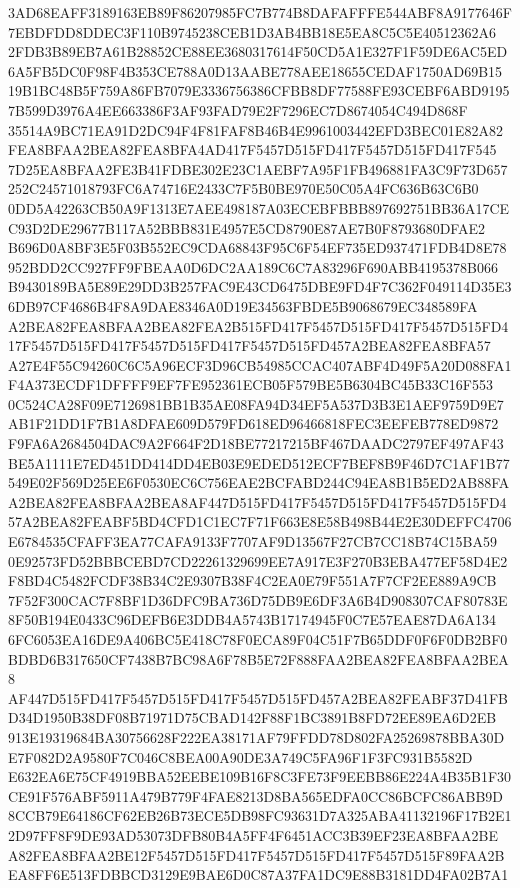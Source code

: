 \documentclass[UTF8,fontset=fandol,zihao=-4,a4paper]{ctexart}
\begin{document}
{{3AD68EAFF3189163EB89F86207985FC7B774B8DAFAFFFE544ABF8A9177646F7EBDFDD8DDEC3F110B9745238CEB1D3AB4BB18E5EA8C5C5E40512362A6
2FDB3B89EB7A61B28852CE88EE3680317614F50CD5A1E327F1F59DE6AC5ED6A5FB5DC0F98F4B353CE788A0D13AABE778AEE18655CEDAF1750AD69B15
19B1BC48B5F759A86FB7079E3336756386CFBB8DF77588FE93CEBF6ABD91957B599D3976A4EE663386F3AF93FAD79E2F7296EC7D8674054C494D868F
35514A9BC71EA91D2DC94F4F81FAF8B46B4E9961003442EFD3BEC01E82A82FEA8BFAA2BEA82FEA8BFA4AD417F5457D515FD417F5457D515FD417F545
7D25EA8BFAA2FE3B41FDBE302E23C1AEBF7A95F1FB496881FA3C9F73D657252C24571018793FC6A74716E2433C7F5B0BE970E50C05A4FC636B63C6B0
0DD5A42263CB50A9F1313E7AEE498187A03ECEBFBBB897692751BB36A17CEC93D2DE29677B117A52BBB831E4957E5CD8790E87AE7B0F8793680DFAE2
B696D0A8BF3E5F03B552EC9CDA68843F95C6F54EF735ED937471FDB4D8E78952BDD2CC927FF9FBEAA0D6DC2AA189C6C7A83296F690ABB4195378B066
B9430189BA5E89E29DD3B257FAC9E43CD6475DBE9FD4F7C362F049114D35E36DB97CF4686B4F8A9DAE8346A0D19E34563FBDE5B9068679EC348589FA
A2BEA82FEA8BFAA2BEA82FEA2B515FD417F5457D515FD417F5457D515FD417F5457D515FD417F5457D515FD417F5457D515FD457A2BEA82FEA8BFA57
A27E4F55C94260C6C5A96ECF3D96CB54985CCAC407ABF4D49F5A20D088FA1F4A373ECDF1DFFFF9EF7FE952361ECB05F579BE5B6304BC45B33C16F553
0C524CA28F09E7126981BB1B35AE08FA94D34EF5A537D3B3E1AEF9759D9E7AB1F21DD1F7B1A8DFAE609D579FD618ED96466818FEC3EEFEB778ED9872
F9FA6A2684504DAC9A2F664F2D18BE77217215BF467DAADC2797EF497AF43BE5A1111E7ED451DD414DD4EB03E9EDED512ECF7BEF8B9F46D7C1AF1B77
549E02F569D25EE6F0530EC6C756EAE2BCFABD244C94EA8B1B5ED2AB88FAA2BEA82FEA8BFAA2BEA8AF447D515FD417F5457D515FD417F5457D515FD4
57A2BEA82FEABF5BD4CFD1C1EC7F71F663E8E58B498B44E2E30DEFFC4706E6784535CFAFF3EA77CAFA9133F7707AF9D13567F27CB7CC18B74C15BA59
0E92573FD52BBBCEBD7CD22261329699EE7A917E3F270B3EBA477EF58D4E2F8BD4C5482FCDF38B34C2E9307B38F4C2EA0E79F551A7F7CF2EE889A9CB
7F52F300CAC7F8BF1D36DFC9BA736D75DB9E6DF3A6B4D908307CAF80783E8F50B194E0433C96DEFB6E3DDB4A5743B17174945F0C7E57EAE87DA6A134
6FC6053EA16DE9A406BC5E418C78F0ECA89F04C51F7B65DDF0F6F0DB2BF0BDBD6B317650CF7438B7BC98A6F78B5E72F888FAA2BEA82FEA8BFAA2BEA8
AF447D515FD417F5457D515FD417F5457D515FD457A2BEA82FEABF37D41FBD34D1950B38DF08B71971D75CBAD142F88F1BC3891B8FD72EE89EA6D2EB
913E19319684BA30756628F222EA38171AF79FFDD78D802FA25269878BBA30DE7F082D2A9580F7C046C8BEA00A90DE3A749C5FA96F1F3FC931B5582D
E632EA6E75CF4919BBA52EEBE109B16F8C3FE73F9EEBB86E224A4B35B1F30CE91F576ABF5911A479B779F4FAE8213D8BA565EDFA0CC86BCFC86ABB9D
8CCB79E64186CF62EB26B73ECE5DB98FC93631D7A325ABA41132196F17B2E12D97FF8F9DE93AD53073DFB80B4A5FF4F6451ACC3B39EF23EA8BFAA2BE
A82FEA8BFAA2BE12F5457D515FD417F5457D515FD417F5457D515F89FAA2BEA8FF6E513FDBBCD3129E9BAE6D0C87A37FA1DC9E88B3181DD4FA02B7A1
}}
\end{document}

